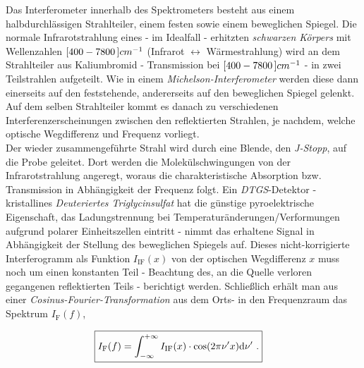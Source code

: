 \documentclass[numbers=noenddot,a4paper,10pt,twocolumn]{article}
\newcommand{\diff}{\textnormal{d}}
\newcommand{\ix}[1]{_\text{#1}}
\newcommand{\tilt}[1]{\textit{#1}}
\begin{document}
		Das Interferometer innerhalb des Spektrometers besteht aus einem halbdurchl\"assigen Strahlteiler, einem festen sowie einem beweglichen Spiegel. Die normale Infrarotstrahlung eines - im Idealfall - erhitzten \tilt{schwarzen K\"orpers} \cite{FTIRSpek} mit Wellenzahlen $\unit[[400-7800]]{cm^{-1}}$ (Infrarot $\leftrightarrow$ W\"armestrahlung) wird an dem Strahlteiler aus Kaliumbromid - Transmission bei $\unit[[400-7800]]{cm^{-1}}$ - in zwei Teilstrahlen aufgeteilt. Wie in einem \tilt{Michelson-Interferometer} werden diese dann einerseits auf den feststehende, andererseits auf den beweglichen Spiegel gelenkt. Auf dem selben Strahlteiler kommt es danach zu verschiedenen Interferenzerscheinungen zwischen den reflektierten Strahlen, je nachdem, welche optische Wegdifferenz und Frequenz vorliegt.\\
		Der wieder zusammengef\"uhrte Strahl wird durch eine Blende, den \tilt{J-Stopp}, auf die Probe geleitet. Dort werden die Molek\"ulschwingungen von der Infrarotstrahlung angeregt, woraus die charakteristische Absorption bzw. Transmission in Abh\"angigkeit der Frequenz folgt. Ein \tilt{DTGS}-Detektor - kristallines \tilt{Deuteriertes Triglycinsulfat} hat die g\"unstige pyroelektrische Eigenschaft, das Ladungstrennung bei Temperatur\"anderungen/Verformungen aufgrund polarer Einheitszellen eintritt - nimmt das erhaltene Signal in Abh\"angigkeit der Stellung des beweglichen Spiegels auf. Dieses nicht-korrigierte Interferogramm als Funktion $I\ix{IF}(x)$ von der optischen Wegdifferenz $x$ muss noch um einen konstanten Teil - Beachtung des, an die Quelle verloren gegangenen reflektierten Teils - berichtigt werden. Schlie{\ss}lich erh\"alt man aus einer  \tilt{Cosinus-Fourier-Transformation} aus dem Orts- in den Frequenzraum das Spektrum $I\ix{F}(f)$,
		
			\begin{align}
				\Aboxed{
				I\ix{F}(f)=\int_{-\infty}^{+\infty}I\ix{IF}(x)\cdot\cos(2\pi\nu^{\prime}x)\diff \nu^{\prime}\,\, .
				}
				\label{eq:fourier}
			\end{align}
		
\end{document}
